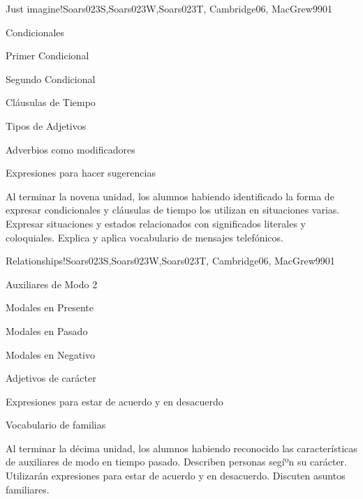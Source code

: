 \begin{syllabus}
\begin{unit}{Just imagine!}{Soars023S,Soars023W,Soars023T, Cambridge06, MacGrew99}{0}{1}
   \begin{topics}
      \item Condicionales
      \item Primer Condicional
      \item Segundo Condicional
      \item Cláusulas de Tiempo
      \item Tipos de Adjetivos
      \item Adverbios como modificadores
      \item Expresiones para hacer sugerencias
   \end{topics}

   \begin{unitgoals}
      \item Al terminar la novena unidad, los alumnos habiendo identificado la forma de expresar condicionales y cláusulas de tiempo los utilizan en situaciones varias. Expresar situaciones y estados relacionados con significados literales y coloquiales. Explica y aplica vocabulario de mensajes telefónicos.
   \end{unitgoals}

\end{unit}

\begin{unit}{Relationships!}{Soars023S,Soars023W,Soars023T, Cambridge06, MacGrew99}{0}{1}
   \begin{topics}
      \item Auxiliares de Modo 2
      \item Modales en Presente
      \item Modales en Pasado
      \item Modales en Negativo
      \item Adjetivos de carácter
      \item Expresiones para estar de acuerdo y en desacuerdo
      \item Vocabulario de familias
   \end{topics}

   \begin{unitgoals}
      \item Al terminar la décima unidad, los alumnos habiendo reconocido las caracterí­sticas de auxiliares de modo en tiempo pasado. Describen personas segíºn su carácter. Utilizarán expresiones para estar de acuerdo y en desacuerdo. Discuten asuntos familiares. 
   \end{unitgoals}


\end{unit}
\end{syllabus}
